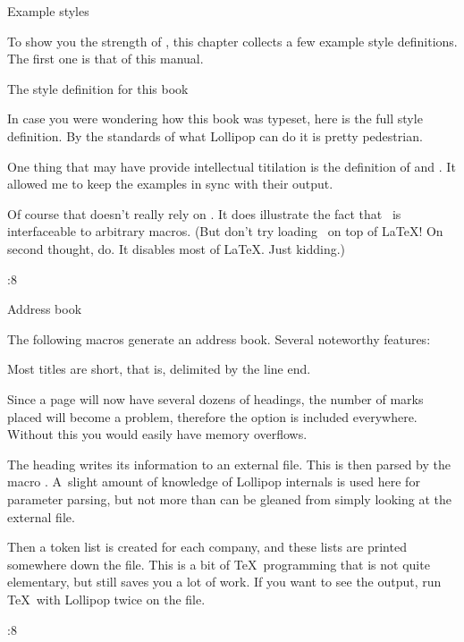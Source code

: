 %
%
%
%
%
%
\Chapter Example styles

To show you the strength of \Lollipop, this chapter collects a few
example style definitions. The first one is that of this manual.

\Section The style definition for this book

In case you were wondering how this book was typeset, here is the
full style definition. By the standards of what Lollipop can do it is
pretty pedestrian.

One thing that may have provide intellectual titilation is the
definition of  and .
It allowed me to keep the examples in sync with their output.

Of course that
doesn't really rely on \Lollipop. It does illustrate the fact that
\Lollipop\ is interfaceable to arbitrary macros. (But don't try
loading \Lollipop\ on top of \LaTeX! On second thought, do. It
disables most of \LaTeX. Just kidding.)

\begingroup \PointSize:8 \tt 
{}\endgroup

 Address book

The following macros generate an address book. Several noteworthy
features:
\Itemize\item Most titles are short, that is, delimited by the line
end.
 \item Since a page will now have several dozens of headings, the
number of marks placed will become a problem, therefore the option
 is included everywhere. Without this you would easily
have memory overflows.
 \item The  heading writes its information to an external
file. This is then parsed by the macro . A~slight amount
of knowledge of Lollipop internals is used here for parameter parsing,
but not more than can be gleaned from simply looking at the external
file.\par
 Then a token list is created for each company, and these lists are
printed somewhere down the file. This is a bit of \TeX\ programming
that is not quite elementary, but still \Lollipop saves you a lot of
work.
 \>
If you want to see the output, run \TeX\ with Lollipop twice on the
 file.

 \begingroup \PointSize:8 \tt 
{}\endgroup

\endinput